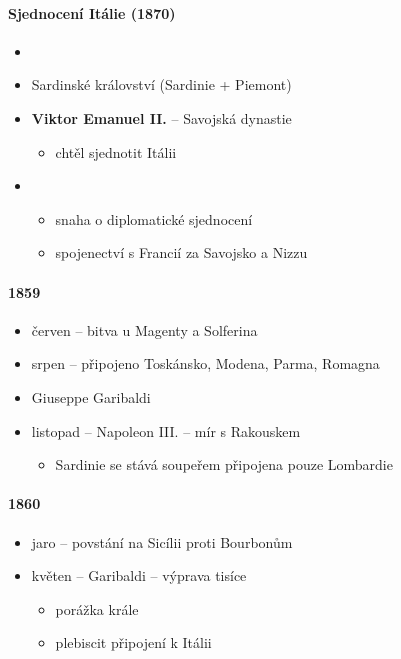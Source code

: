 \paragraph{Sjednocení Itálie (1870)}
\begin{itemize}
\item {}
\item Sardinské království (Sardinie + Piemont)
\item \textbf{Viktor Emanuel II.} -- Savojská dynastie
	\begin{itemize}
	\item chtěl sjednotit Itálii
	\end{itemize}
\item {}
	\begin{itemize}
	\item snaha o diplomatické sjednocení
	\item[\ra] spojenectví s Francií za Savojsko a Nizzu
	\end{itemize}
\end{itemize}

\paragraph{1859}
\begin{itemize}
\item červen -- bitva u Magenty a Solferina
\item srpen -- připojeno Toskánsko, Modena, Parma, Romagna
\item Giuseppe Garibaldi
\item listopad -- Napoleon III. -- mír s Rakouskem 
	\begin{itemize}
	\item Sardinie se stává soupeřem \ra připojena pouze Lombardie
	\end{itemize}
\end{itemize}


\paragraph{1860}
\begin{itemize}
\item jaro -- povstání na Sicílii proti Bourbonům
\item květen -- Garibaldi -- výprava tisíce 
	\begin{itemize}
	\item porážka krále 
	\item[\ra] plebiscit \ra připojení k Itálii
	\end{itemize}
\end{itemize}

